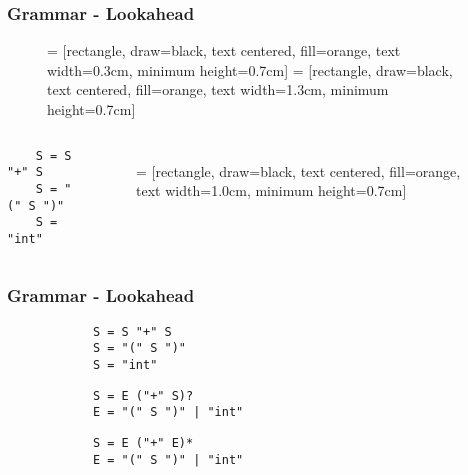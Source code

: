 \documentclass{beamer}
\begin{document}
    \begin{frame}[fragile]
        \frametitle{Grammar - Lookahead}
        \begin{figure}
         = [rectangle, draw=black, text centered, fill=orange, text width=0.3cm, minimum height=0.7cm]
         = [rectangle, draw=black, text centered, fill=orange, text width=1.3cm, minimum height=0.7cm]
        \end{figure}
        \begin{columns}
        \begin{verbatim}
    S = S "+" S
    S = "(" S ")"
    S = "int"
        \end{verbatim}
        \begin{figure}
         = [rectangle, draw=black, text centered, fill=orange, text width=1.0cm, minimum height=0.7cm]
        \end{figure}
        \end{columns}
    \end{frame}

    \begin{frame}[fragile]
        \frametitle{Grammar - Lookahead}
        \begin{verbatim}
            S = S "+" S
            S = "(" S ")"
            S = "int"
        \end{verbatim}
        \pause
        \begin{verbatim}
            S = E ("+" S)?
            E = "(" S ")" | "int"
        \end{verbatim}
        \pause
        \begin{verbatim}
            S = E ("+" E)*
            E = "(" S ")" | "int"
        \end{verbatim}
    \end{frame}
\end{document}
